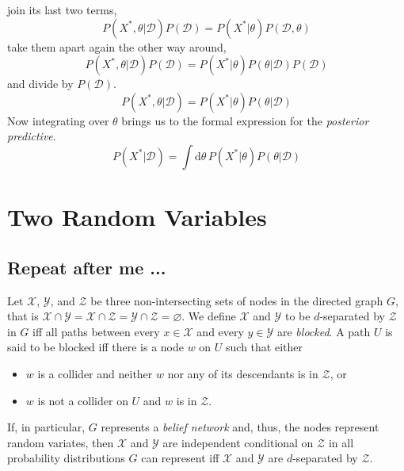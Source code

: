 \documentclass[]{report}
\begin{document}
join its last two terms,
\begin{equation}
P(X^*, \theta|\mathcal{D})P(\mathcal{D}) = P(X^*|\theta)P(\mathcal{D}, \theta)
\end{equation}
take them apart again the other way around,
\begin{equation}
P(X^*, \theta|\mathcal{D})P(\mathcal{D}) = P(X^*|\theta)P(\theta|\mathcal{D})P(\mathcal{D})
\end{equation}
and divide by $P(\mathcal{D})$.
\begin{equation}
P(X^*, \theta|\mathcal{D}) = P(X^*|\theta)P(\theta|\mathcal{D})
\end{equation}
Now integrating over $\theta$ brings us to the formal expression for the \emph{posterior predictive}.
\begin{equation} \label{eq:post_pred}
P(X^*|\mathcal{D}) = \int\mathrm{d}\theta\,P(X^*|\theta)P(\theta|\mathcal{D})
\end{equation}

\chapter{Two Random Variables}
\section{Repeat after me ...} \label{sect:d-connect}
Let $\mathcal{X}$, $\mathcal{Y}$, and $\mathcal{Z}$ be three non-intersecting sets of nodes in the directed graph $G$, that is $\mathcal{X}\cap\mathcal{Y} = \mathcal{X}\cap\mathcal{Z} = \mathcal{Y}\cap\mathcal{Z} = \varnothing$. We define
$\mathcal{X}$ and $\mathcal{Y}$ to be $d$-separated by $\mathcal{Z}$ in $G$ iff all paths between every $x \in \mathcal{X}$ and every $y \in \mathcal{Y}$ are \emph{blocked}. A path $U$ is said to be blocked iff there is a node $w$ on $U$ such that either
\begin{itemize}
	\item $w$ is a collider and neither $w$ nor any of its descendants is in $\mathcal{Z}$, or
	\item $w$ is not a collider on $U$ and $w$ is in $\mathcal{Z}$.
\end{itemize}
If, in particular, $G$ represents a \emph{belief network} and, thus, the nodes represent random variates, then $\mathcal{X}$ and $\mathcal{Y}$ are independent conditional on $\mathcal{Z}$ in all probability distributions $G$ can represent iff $\mathcal{X}$ and $\mathcal{Y}$ are $d$-separated by $\mathcal{Z}$.
\end{document}
